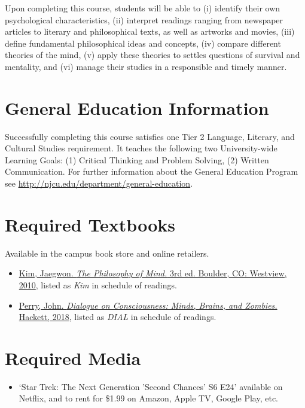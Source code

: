 \documentclass[article,oneside]{memoir}
\begin{document}
Upon completing this course, students will be able to  (i) identify their own psychological characteristics, (ii) interpret readings ranging from newspaper articles to literary and philosophical texts, as well as artworks and movies, (iii) define fundamental philosophical ideas and concepts, (iv) compare different theories of the mind, (v) apply these theories to settles questions of survival and mentality,  and  (vi) manage their studies in a responsible and timely manner. 


\section{General Education Information} 
Successfully completing this course satisfies one Tier 2 Language, Literary, and Cultural Studies requirement. It teaches the following two University-wide Learning Goals: (1) Critical Thinking and Problem Solving, (2) Written Communication. For further information about the General Education Program see \href{http://njcu.edu/department/general-education}{http://njcu.edu/department/general-education}.


\section{Required Textbooks}
Available in the campus book store and online retailers.


\begin{itemize}
\item \href{https://www.amazon.com/Philosophy-Mind-Jaegwon-Kim/dp/0813344581/ref=sr_1_1?ie=UTF8&qid=1484684648&sr=8-1&keywords=kim+philosophy+of+mind}{Kim, Jaegwon. \emph{The Philosophy of Mind.} 3rd ed. Boulder, CO: Westview, 2010}, listed as \emph{Kim} in schedule of readings.
\item \href{https://www.amazon.com/Dialogue-Consciousness-Zombies-Philosophical-Dialogues/dp/1624667368/ref=sr_1_1?ie=UTF8&qid=1545172478&sr=8-1&keywords=john+perry+consciousness}{Perry, John. \emph{Dialogue on Consciousness: Minds, Brains, and Zombies.} Hackett, 2018}, listed as \emph{DIAL} in schedule of readings.
\end{itemize}

\section{Required Media}
\begin{itemize}
\item `Star Trek: The Next Generation 'Second Chances' S6 E24' available on Netflix, and to rent for \$1.99 on Amazon, Apple TV, Google Play, etc. 
\end{itemize}
\end{document}

